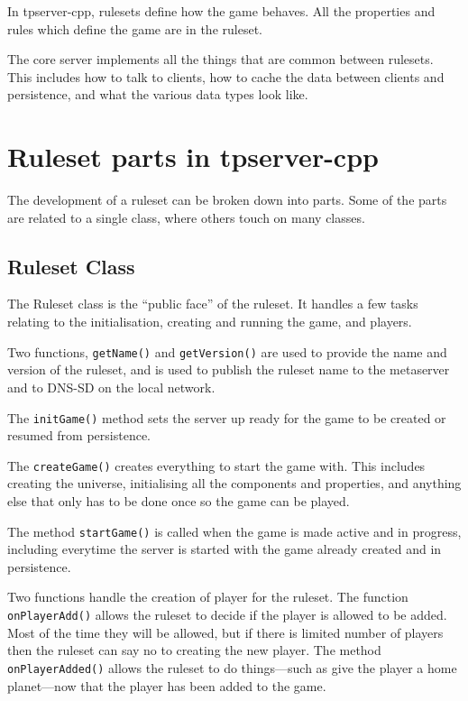 \documentclass[a4paper,11pt]{report}
\begin{document}
In tpserver-cpp, rulesets define how the game behaves.  All the properties and rules which define the game are in the ruleset.

The core server implements all the things that are common between rulesets. This includes how to talk to clients, how to cache the data between clients and persistence, and what the various data types look like.



\chapter{Ruleset parts in tpserver-cpp}
\label{chap:ruleset-parts}

The development of a ruleset can be broken down into parts. Some of the parts are related to a single class, where others touch on many classes.

\section{Ruleset Class}
\label{sec:ruleset-class}

The Ruleset class is the ``public face'' of the ruleset. It handles a few tasks relating to the initialisation, creating and running the game, and players.

Two functions, \texttt{getName()} and \texttt{getVersion()} are used to provide the name and version of the ruleset, and is used to publish the ruleset name to the metaserver and to DNS-SD on the local network.

The \texttt{initGame()} method sets the server up ready for the game to be created or resumed from persistence.

The \texttt{createGame()} creates everything to start the game with. This includes creating the universe, initialising all the components and properties, and anything else that only has to be done once so the game can be played.

The method \texttt{startGame()} is called when the game is made active and in progress, including everytime the server is started with the game already created and in persistence.

Two functions handle the creation of player for the ruleset.  The function \texttt{onPlayerAdd()} allows the ruleset to decide if the player is allowed to be added. Most of the time they will be allowed, but if there is limited number of players then the ruleset can say no to creating the new player. The method \texttt{onPlayerAdded()} allows the ruleset to do things---such as give the player a home planet---now that the player has been added to the game.
\end{document}
